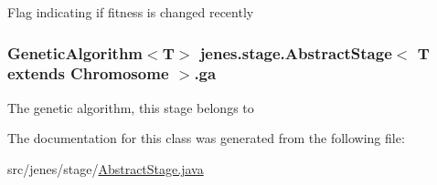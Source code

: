 Flag indicating if fitness is changed recently \hypertarget{classjenes_1_1stage_1_1_abstract_stage_3_01_t_01extends_01_chromosome_01_4_a751aba4f46b29d22592d48422ffa75f9}{
\subsubsection[{ga}]{\setlength{\rightskip}{0pt plus 5cm}Genetic\-Algorithm$<$T$>$ jenes.\-stage.\-Abstract\-Stage$<$ T extends Chromosome $>$.ga\hspace{0.3cm}{\ttfamily [protected]}}}\label{classjenes_1_1stage_1_1_abstract_stage_3_01_t_01extends_01_chromosome_01_4_a751aba4f46b29d22592d48422ffa75f9}
The genetic algorithm, this stage belongs to 

The documentation for this class was generated from the following file\-:\begin{DoxyCompactItemize}
\item 
src/jenes/stage/\hyperlink{_abstract_stage_8java}{Abstract\-Stage.\-java}\end{DoxyCompactItemize}
